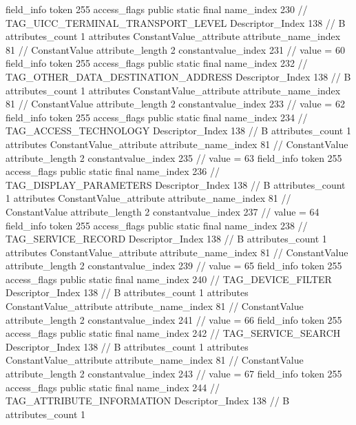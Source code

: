 {{{{{{{				}
				}
			}
			field_info {
				token	255
				access_flags	public static final
				name_index	230		// TAG_UICC_TERMINAL_TRANSPORT_LEVEL
				Descriptor_Index	138		// B
				attributes_count	1
				attributes {
				ConstantValue_attribute {
					attribute_name_index	81		// ConstantValue
					attribute_length	2
					constantvalue_index	231		// value = 60
				}
				}
			}
			field_info {
				token	255
				access_flags	public static final
				name_index	232		// TAG_OTHER_DATA_DESTINATION_ADDRESS
				Descriptor_Index	138		// B
				attributes_count	1
				attributes {
				ConstantValue_attribute {
					attribute_name_index	81		// ConstantValue
					attribute_length	2
					constantvalue_index	233		// value = 62
				}
				}
			}
			field_info {
				token	255
				access_flags	public static final
				name_index	234		// TAG_ACCESS_TECHNOLOGY
				Descriptor_Index	138		// B
				attributes_count	1
				attributes {
				ConstantValue_attribute {
					attribute_name_index	81		// ConstantValue
					attribute_length	2
					constantvalue_index	235		// value = 63
				}
				}
			}
			field_info {
				token	255
				access_flags	public static final
				name_index	236		// TAG_DISPLAY_PARAMETERS
				Descriptor_Index	138		// B
				attributes_count	1
				attributes {
				ConstantValue_attribute {
					attribute_name_index	81		// ConstantValue
					attribute_length	2
					constantvalue_index	237		// value = 64
				}
				}
			}
			field_info {
				token	255
				access_flags	public static final
				name_index	238		// TAG_SERVICE_RECORD
				Descriptor_Index	138		// B
				attributes_count	1
				attributes {
				ConstantValue_attribute {
					attribute_name_index	81		// ConstantValue
					attribute_length	2
					constantvalue_index	239		// value = 65
				}
				}
			}
			field_info {
				token	255
				access_flags	public static final
				name_index	240		// TAG_DEVICE_FILTER
				Descriptor_Index	138		// B
				attributes_count	1
				attributes {
				ConstantValue_attribute {
					attribute_name_index	81		// ConstantValue
					attribute_length	2
					constantvalue_index	241		// value = 66
				}
				}
			}
			field_info {
				token	255
				access_flags	public static final
				name_index	242		// TAG_SERVICE_SEARCH
				Descriptor_Index	138		// B
				attributes_count	1
				attributes {
				ConstantValue_attribute {
					attribute_name_index	81		// ConstantValue
					attribute_length	2
					constantvalue_index	243		// value = 67
				}
				}
			}
			field_info {
				token	255
				access_flags	public static final
				name_index	244		// TAG_ATTRIBUTE_INFORMATION
				Descriptor_Index	138		// B
				attributes_count	1
}}}}}
